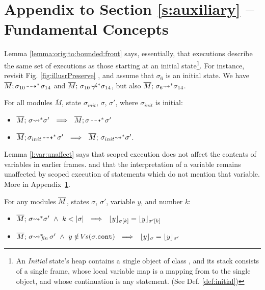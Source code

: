 \section{Appendix to Section \ref{s:auxiliary}  --  Fundamental Concepts }
\label{app:aux}

Lemma \ref{lemma:orig:to:bounded:front} says, essentially,  that \scoped executions describe the same set of executions as those  starting at an initial state\footnote{An \emph{Initial} state's heap contains a single object of class , and
its  stack   consists of a single frame, whose local variable map is a mapping from  to the single object, and whose continuation is  any statement.
(See Def. \ref{def:initial})}.   
For instance, revisit  Fig. \ref{fig:illusrPreserve} , and assume that $\sigma_6$ is an initial state.
We have  $\overline{M};\sigma_{10}\! \dashrightarrow^*\! {\sigma_{14}}$ and $ \overline{M};\, {\sigma_{10}} \not\!\!\!{\rightsquigarrow^*} \sigma_{14}$, but also 
 $\overline{M};\, {\sigma_{6}} {\rightsquigarrow^*} \sigma_{14}$. %

 \begin{lemma}
\label{lemma:orig:to:bounded:front}
For all modules $\overline M$, state  $\sigma_{init}$,  $\sigma$, $\sigma'$, where
$\sigma_{init}$ is  initial:
\begin{itemize} %
\item 
\label{otbOne}
$\leadstoBoundedStar  {\Mtwo}  {\sigma} {\sigma'} \ \ \Longrightarrow \  \
\leadstoOrigStar {\Mtwo} {\sigma}  {\sigma'}$
\item 
\label{otbTwo}
$\overline{M};\sigma_{init}\! \dashrightarrow^*\! {\sigma'}  \ \  \Longrightarrow\ \
\overline{M};\, {\sigma_{init}} {\rightsquigarrow^*} \sigma'$.
\end{itemize}
\end{lemma}

\vspace{.05cm}

{Lemma \ref{l:var:unaffect} says that scoped execution does not affect the contents of variables in earlier frames.}
and that 
the interpretation of a variable remains unaffected by
scoped execution of statements  which do not mention that variable. More  in Appendix~\ref{app:aux}.

\begin{lemma}
\label{l:var:unaffect}
For any modules $\overline{M}$, states $\sigma$, $\sigma'$,  variable $y$, and number $k$:
\begin{itemize}
\item
\label{carInFrame}
{$\leadstoBoundedStar {\Mtwo}  {\sigma}  {\sigma'}  \ \wedge \ k<\DepthSt \sigma  \ \ \Longrightarrow \ \  \interpret {\RestrictTo \sigma k} y =  \interpret {\RestrictTo {\sigma'} k} y$
}
\item
$\leadstoBoundedStarFin {\Mtwo}  {\sigma}  {\sigma'} \ \wedge \ y\notin \vs(\sigma.\prg{cont}) \ \ \Longrightarrow \ \  \interpret \sigma y =  \interpret {\sigma'} y$
\end{itemize}
\end{lemma}

